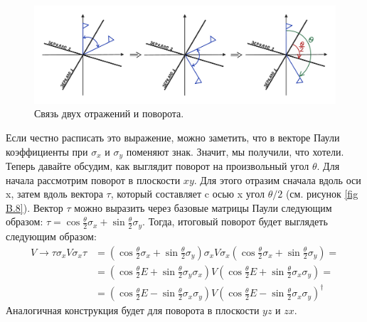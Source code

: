 \begin{figure}[!ht]
\centering
\includegraphics[scale=0.3]{appendix/images/reflections and turn.png}
\caption{Связь двух отражений и поворота.}
\label{fig B.7}
\end{figure}

Если честно расписать это выражение, можно заметить, что в векторе Паули коэффициенты при $\sigma_x$ и $\sigma_y$ поменяют знак. Значит, мы получили, что хотели. Теперь давайте обсудим, как выглядит поворот на произвольный угол $\theta$. Для начала рассмотрим поворот в плоскости $xy$. Для этого отразим сначала вдоль оси x, затем вдоль вектора $\tau$, который составляет c осью x угол $\theta/2$ (см. рисунок \ref{fig B.8}). Вектор $\tau$ можно выразить через базовые матрицы Паули следующим образом: $\tau = \cos\frac{\theta}{2}\sigma_x + \sin\frac{\theta}{2}\sigma_y$. Тогда, итоговый поворот будет выглядеть следующим образом:
\begin{align*}
    V \rightarrow \tau \sigma_x V \sigma_x \tau &= \left(\cos\frac{\theta}{2}\sigma_x + \sin\frac{\theta}{2}\sigma_y\right)\sigma_x V \sigma_x \left(\cos\frac{\theta}{2}\sigma_x + \sin\frac{\theta}{2}\sigma_y\right) = \\
    & = \left(\cos\frac{\theta}{2}E + \sin\frac{\theta}{2}\sigma_y\sigma_x\right)V\left(\cos\frac{\theta}{2}E + \sin\frac{\theta}{2}\sigma_x\sigma_y\right) = \\
    & = \left(\cos\frac{\theta}{2}E - \sin\frac{\theta}{2}\sigma_x\sigma_y\right)V\left(\cos\frac{\theta}{2}E - \sin\frac{\theta}{2}\sigma_x\sigma_y\right)^{\dagger}
\end{align*}
Аналогичная конструкция будет для поворота в плоскости $yz$ и $zx$.

